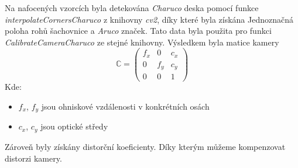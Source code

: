\documentclass[journal,twoside,web]{ieeecolor}
\begin{document}
            Na nafocených vzorcích byla detekována \textit{Charuco} deska pomocí funkce \textit{interpolateCornersCharuco}
            z knihovny \textit{cv2}, díky které byla získána Jednoznačná poloha rohů šachovnice a \textit{Aruco} značek.
            Tato data byla použita pro funkci \textit{CalibrateCameraCharuco} ze stejné knihovny.
            Výsledkem byla matice kamery
            \begin{equation}
                \mathbb{C} = \begin{pmatrix}f_x&0&c_x\\0&f_y&c_y\\0&0&1\end{pmatrix}
            \end{equation}
            Kde:
            \begin{itemize}
                \item $f_x$, $f_y$ jsou ohniskové vzdálenosti v konkrétních osách\\
                \item $c_x$, $c_y$ jsou optické středy\\
            \end{itemize}
            Zároveň byly získány distorční koeficienty. Díky kterým můžeme kompenzovat distorzi kamery.
\end{document}
